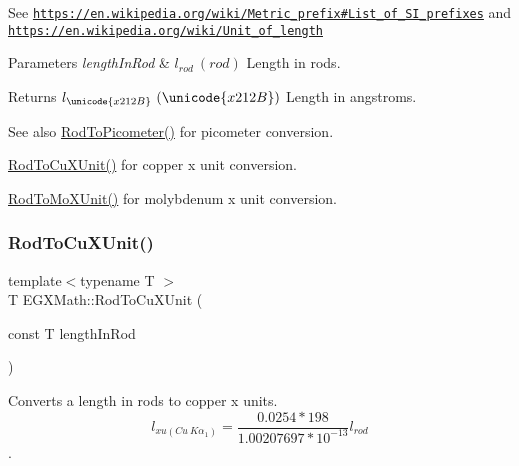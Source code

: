 See \href{https://en.wikipedia.org/wiki/Metric_prefix#List_of_SI_prefixes}{\tt https\+://en.\+wikipedia.\+org/wiki/\+Metric\+\_\+prefix\#\+List\+\_\+of\+\_\+\+S\+I\+\_\+prefixes} and \href{https://en.wikipedia.org/wiki/Unit_of_length}{\tt https\+://en.\+wikipedia.\+org/wiki/\+Unit\+\_\+of\+\_\+length} 
\begin{DoxyParams}{Parameters}
{\em length\+In\+Rod} & $ l_{rod}\ (rod)$ Length in rods. \\
\hline
\end{DoxyParams}
\begin{DoxyReturn}{Returns}
$ l_{\unicode{x212B}}\ (\unicode{x212B})$ Length in angstroms. 
\end{DoxyReturn}
\begin{DoxySeeAlso}{See also}
\mbox{\hyperlink{group___e_g_x_math-_conversions-_length_conversions-_imperial-_rod-_s_i_ga212e66c6922a0df85714ec8559af8790}{Rod\+To\+Picometer()}} for picometer conversion. 

\mbox{\hyperlink{group___e_g_x_math-_conversions-_length_conversions-_imperial-_rod-_non-_s_i_gac344dc1fbafaa0451704947bf33a8594}{Rod\+To\+Cu\+X\+Unit()}} for copper x unit conversion. 

\mbox{\hyperlink{group___e_g_x_math-_conversions-_length_conversions-_imperial-_rod-_non-_s_i_gac5c3c27eea891ef32353d16c6b8c57ab}{Rod\+To\+Mo\+X\+Unit()}} for molybdenum x unit conversion. 
\end{DoxySeeAlso}
\mbox{\label{group___e_g_x_math-_conversions-_length_conversions-_imperial-_rod-_non-_s_i_gac344dc1fbafaa0451704947bf33a8594}} 
\subsubsection{\texorpdfstring{Rod\+To\+Cu\+X\+Unit()}{RodToCuXUnit()}}
{\footnotesize\ttfamily template$<$typename T $>$ \\
T E\+G\+X\+Math\+::\+Rod\+To\+Cu\+X\+Unit (\begin{DoxyParamCaption}\item[{const T}]{length\+In\+Rod }\end{DoxyParamCaption})}



Converts a length in rods to copper x units. \[ l_{xu(Cu\ K\alpha_1)}=\frac{0.0254 * 198}{1.00207697*10^{-13}} l_{rod}\]. 


